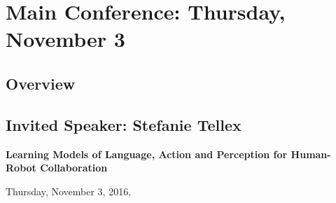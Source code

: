 %




\chapter{Main Conference: Thursday, November 3}
\thispagestyle{emptyheader}
\section*{Overview}

\clearpage{}

\section{Invited Speaker: Stefanie Tellex}

\begin{center}
\textbf{\Large{}Learning Models of Language, Action and Perception for Human-Robot Collaboration}{\Large{}\vspace{1em}
}
\par\end{center}{\Large \par}

\begin{center}
Thursday, November 3, 2016,  \vspace{1em}
\\
 \PlenaryLoc \\
 \vspace{1em}

\par\end{center}

